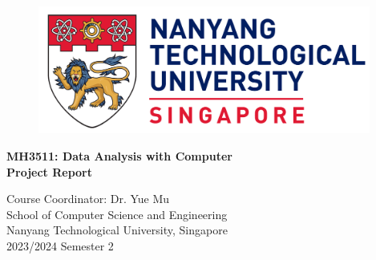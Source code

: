 \begin{titlepage}
	\begin{figure}[!t]
		\centering
		\includegraphics[width = 4.3in]{title/logo.pdf}
	\end{figure}
	
	\centering
	\huge{\textbf{MH3511: Data Analysis with Computer}}\\[0.2in]
	\huge{\textbf{Project Report}}\\[2in]
	

	 \begin{table}[h]
	  \centering
	  \end{table}

	\Large{Course Coordinator: Dr. Yue Mu}\\[0.5in]
	
	
	\LARGE{School of Computer Science and Engineering}\\
	\LARGE{Nanyang Technological University, Singapore}\\[0.3in]
	
	
	\LARGE{2023/2024 Semester 2}
	\newpage
\end{titlepage}